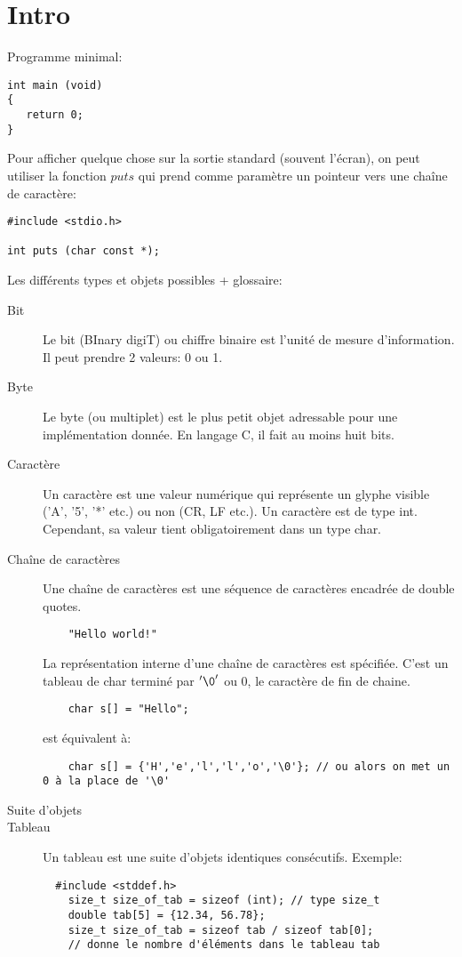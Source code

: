 \documentclass[a4paper]{article}
\begin{document}
\section{Intro}
Programme minimal:
\begin{lstlisting}
int main (void)
{
   return 0;
}
\end{lstlisting}
Pour afficher quelque chose sur la sortie standard (souvent l'écran), on peut utiliser la fonction $puts$ qui prend comme paramètre un pointeur vers une chaîne de caractère:
\begin{lstlisting}
#include <stdio.h>

int puts (char const *);
\end{lstlisting}
Les différents types et objets possibles + glossaire:
\begin{description}
  \item [Bit] Le bit (BInary digiT) ou chiffre binaire est l'unité de mesure d'information. Il peut prendre 2 valeurs: 0 ou 1.
  \item [Byte] Le byte (ou multiplet) est le plus petit objet adressable pour une implémentation donnée. En langage C, il fait au moins huit bits.
  \item [Caractère] Un caractère est une valeur numérique qui représente un glyphe visible ('A', '5', '*' etc.) ou non (CR, LF etc.). Un caractère est de type int. Cependant, sa valeur tient obligatoirement dans un type char.
  \item [Chaîne de caractères] Une chaîne de caractères est une séquence de caractères encadrée de double quotes. \newline
  \begin{lstlisting}
    "Hello world!"
  \end{lstlisting}
  La représentation interne d'une chaîne de caractères est spécifiée. C'est un tableau de char terminé par $'\0'$ ou $0$, le caractère de fin de chaine.
  \begin{lstlisting}
    char s[] = "Hello";
  \end{lstlisting}

  est équivalent à:
  \begin{lstlisting}
    char s[] = {'H','e','l','l','o','\0'}; // ou alors on met un 0 à la place de '\0'
  \end{lstlisting}

  \item [\guillemotleft{}Suite d'objets\guillemotright{}]
  \item [Tableau] Un tableau est une suite d'objets identiques consécutifs.\newline
  Exemple:
  \begin{lstlisting}
  #include <stddef.h>
    size_t size_of_tab = sizeof (int); // type size_t
    double tab[5] = {12.34, 56.78};
    size_t size_of_tab = sizeof tab / sizeof tab[0];
    // donne le nombre d'éléments dans le tableau tab
  \end{lstlisting}


\end{description}
\end{document}
